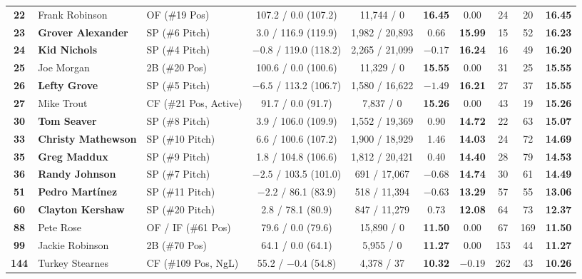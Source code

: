 \documentclass[11pt,letterpaper]{article}
\theoremstyle{plain}
\theoremstyle{definition}
\theoremstyle{remark}
\begin{document}
\begin{table}[htbp]
{\begin{tabular}{@{}cllccccccc@{}}
\textbf{22} & Frank Robinson & OF (\#19 Pos) & 107.2 / 0.0 (107.2) & 11,744 / 0 & \textbf{16.45} & 0.00 & 24 & 20 & \textbf{16.45} \\
\textbf{23} & \textbf{Grover Alexander} & SP (\#6 Pitch) & 3.0 / 116.9 (119.9) & 1,982 / 20,893 & 0.66 & \textbf{15.99} & 15 & 52 & \textbf{16.23} \\
\textbf{24} & \textbf{Kid Nichols} & SP (\#4 Pitch) & $-0.8$ / 119.0 (118.2) & 2,265 / 21,099 & $-0.17$ & \textbf{16.24} & 16 & 49 & \textbf{16.20} \\
\textbf{25} & Joe Morgan & 2B (\#20 Pos) & 100.6 / 0.0 (100.6) & 11,329 / 0 & \textbf{15.55} & 0.00 & 31 & 25 & \textbf{15.55} \\
\midrule
\textbf{26} & \textbf{Lefty Grove} & SP (\#5 Pitch) & $-6.5$ / 113.2 (106.7) & 1,580 / 16,622 & $-1.49$ & \textbf{16.21} & 27 & 37 & \textbf{15.55} \\
\textbf{27} & Mike Trout & CF (\#21 Pos, Active) & 91.7 / 0.0 (91.7) & 7,837 / 0 & \textbf{15.26} & 0.00 & 43 & 19 & \textbf{15.26} \\
\textbf{30} & \textbf{Tom Seaver} & SP (\#8 Pitch) & 3.9 / 106.0 (109.9) & 1,552 / 19,369 & 0.90 & \textbf{14.72} & 22 & 63 & \textbf{15.07} \\
\textbf{33} & \textbf{Christy Mathewson} & SP (\#10 Pitch) & 6.6 / 100.6 (107.2) & 1,900 / 18,929 & 1.46 & \textbf{14.03} & 24 & 72 & \textbf{14.69} \\
\textbf{35} & \textbf{Greg Maddux} & SP (\#9 Pitch) & 1.8 / 104.8 (106.6) & 1,812 / 20,421 & 0.40 & \textbf{14.40} & 28 & 79 & \textbf{14.53} \\
\textbf{36} & \textbf{Randy Johnson} & SP (\#7 Pitch) & $-2.5$ / 103.5 (101.0) & 691 / 17,067 & $-0.68$ & \textbf{14.74} & 30 & 61 & \textbf{14.49} \\
\textbf{51} & \textbf{Pedro Mart\'{i}nez} & SP (\#11 Pitch) & $-2.2$ / 86.1 (83.9) & 518 / 11,394 & $-0.63$ & \textbf{13.29} & 57 & 55 & \textbf{13.06} \\
\textbf{60} & \textbf{Clayton Kershaw} & SP (\#20 Pitch) & 2.8 / 78.1 (80.9) & 847 / 11,279 & 0.73 & \textbf{12.08} & 64 & 73 & \textbf{12.37} \\
\textbf{88} & Pete Rose & OF / IF (\#61 Pos) & 79.6 / 0.0 (79.6) & 15,890 / 0 & \textbf{11.50} & 0.00 & 67 & 169 & \textbf{11.50} \\
\textbf{99} & Jackie Robinson & 2B (\#70 Pos) & 64.1 / 0.0 (64.1) & 5,955 / 0 & \textbf{11.27} & 0.00 & 153 & 44 & \textbf{11.27} \\
\textbf{144} & Turkey Stearnes & CF (\#109 Pos, NgL) & 55.2 / $-0.4$ (54.8) & 4,378 / 37 & \textbf{10.32} & $-0.19$ & 262 & 43 & \textbf{10.26} \\

\end{tabular}}
\end{table}
\end{document}
